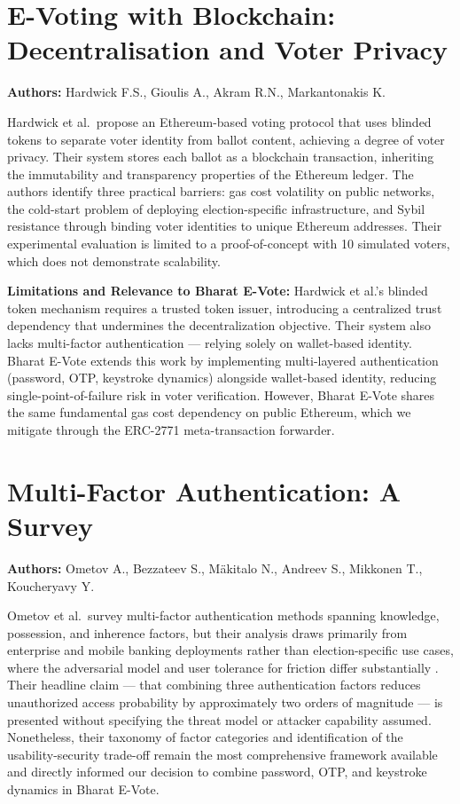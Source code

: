 \documentclass[oneside,a4paper,12pt]{book}
\begin{document}
\section{E-Voting with Blockchain: Decentralisation and Voter Privacy}
\textbf{Authors:} Hardwick F.S., Gioulis A., Akram R.N., Markantonakis K. \cite{hardwick2018}

Hardwick et al.\ propose an Ethereum-based voting protocol that uses blinded tokens to separate voter identity from ballot content, achieving a degree of voter privacy. Their system stores each ballot as a blockchain transaction, inheriting the immutability and transparency properties of the Ethereum ledger. The authors identify three practical barriers: gas cost volatility on public networks, the cold-start problem of deploying election-specific infrastructure, and Sybil resistance through binding voter identities to unique Ethereum addresses. Their experimental evaluation is limited to a proof-of-concept with 10 simulated voters, which does not demonstrate scalability.

\textbf{Limitations and Relevance to Bharat E-Vote:} Hardwick et al.'s blinded token mechanism requires a trusted token issuer, introducing a centralized trust dependency that undermines the decentralization objective. Their system also lacks multi-factor authentication --- relying solely on wallet-based identity. Bharat E-Vote extends this work by implementing multi-layered authentication (password, OTP, keystroke dynamics) alongside wallet-based identity, reducing single-point-of-failure risk in voter verification. However, Bharat E-Vote shares the same fundamental gas cost dependency on public Ethereum, which we mitigate through the ERC-2771 meta-transaction forwarder.

\section{Multi-Factor Authentication: A Survey}
\textbf{Authors:} Ometov A., Bezzateev S., M{\"a}kitalo N., Andreev S., Mikkonen T., Koucheryavy Y. \cite{ometov2018}

Ometov et al.\ survey multi-factor authentication methods spanning knowledge, possession, and inherence factors, but their analysis draws primarily from enterprise and mobile banking deployments rather than election-specific use cases, where the adversarial model and user tolerance for friction differ substantially \cite{ometov2018}. Their headline claim --- that combining three authentication factors reduces unauthorized access probability by approximately two orders of magnitude --- is presented without specifying the threat model or attacker capability assumed. Nonetheless, their taxonomy of factor categories and identification of the usability-security trade-off remain the most comprehensive framework available and directly informed our decision to combine password, OTP, and keystroke dynamics in Bharat E-Vote.
\end{document}
